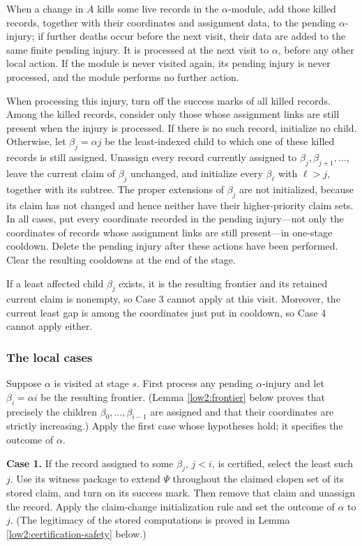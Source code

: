 \documentclass[10pt,a4paper]{amsart}
\begin{document}
When a change in $A$ kills some live records in the $\alpha$-module, add
those killed records, together with their coordinates and assignment data, to
the pending $\alpha$-injury; if further deaths occur before the next visit,
their data are added to the same finite pending injury. It is processed at the
next visit to $\alpha$, before any other local action. If the module is never
visited again, its pending injury is never processed, and the module performs
no further action.

When processing this injury, turn off the success marks of all killed records.
Among the killed records, consider only those whose assignment links are
still present when the injury is processed. If there is no such record,
initialize no child. Otherwise, let $\beta_j=\alpha j$ be the least-indexed
child to which one of these killed records is still assigned. Unassign every
record currently assigned to $\beta_j,\beta_{j+1},\ldots$, leave the current
claim of $\beta_j$ unchanged, and initialize every $\beta_\ell$ with
$\ell>j$, together with its subtree. The proper extensions of $\beta_j$ are
not initialized, because its claim has not changed and hence neither have
their higher-priority claim sets. In all cases, put every coordinate recorded
in the pending injury---not only the coordinates of records whose assignment
links are still present---in one-stage cooldown. Delete the pending injury
after these actions have been performed. Clear the resulting cooldowns at the
end of the stage.

If a least affected child $\beta_j$ exists, it is the resulting frontier and
its retained current claim is nonempty, so Case 3 cannot apply at this visit.
Moreover, the current least gap is among the coordinates just put in cooldown,
so Case 4 cannot apply either.

\subsubsection{The local cases}

Suppose $\alpha$ is visited at stage $s$. First process any pending
$\alpha$-injury and let $\beta_i=\alpha i$ be the resulting frontier. (Lemma
\ref{low2:frontier} below proves that precisely the children
$\beta_0,\ldots,\beta_{i-1}$ are assigned and that their coordinates are
strictly increasing.) Apply the first case whose hypotheses hold; it specifies
the outcome of $\alpha$.

\medskip
\noindent\textbf{Case 1.}
If the record assigned to some $\beta_j$, $j<i$, is certified, select the
least such $j$. Use its witness package to extend $\Psi$ throughout the
claimed clopen set of its stored claim, and turn on its success mark. Then
remove that claim and unassign the record. Apply the claim-change
initialization rule and set the outcome of $\alpha$ to $j$. (The legitimacy of
the stored computations is proved in Lemma
\ref{low2:certification-safety} below.)
\end{document}
